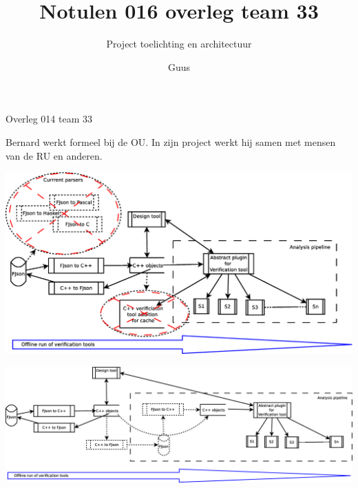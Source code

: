 \documentclass[a4paper,final]{article}
\title{Notulen 016 overleg team 33}
\author{Guus}
\begin{document}

\begin{Minutes}{Overleg 014 team 33}
\subtitle{Project toelichting en architectuur}

\maketitle%

\newcommand{\w}[1]{\textsc{#1}}

 Bernard werkt formeel bij de OU. In zijn
project werkt hij samen met mensen van de RU en anderen.


\begin{center}
	\includegraphics[width=.9\linewidth]{2014-11-29-meeting-architecture-tool-1.eps}
	\label{fig:architecture-high-level-1}
\end{center}

\begin{center}
	\includegraphics[width=.9\linewidth]{2014-11-29-meeting-architecture-tool-2.eps}
	\label{fig:architecture-high-level-2}
\end{center}


\end{Minutes}
\end{document}
